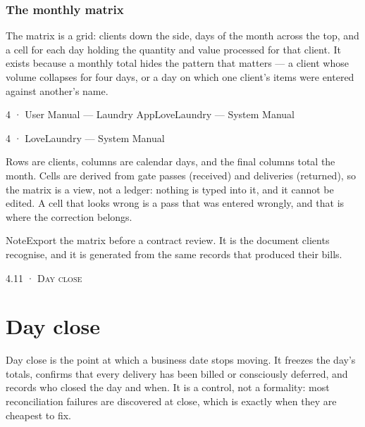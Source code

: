 \documentclass[11pt,a4paper,oneside]{book}
\begin{document}
\subsubsection*{The monthly matrix}
The matrix is a grid: clients down the side, days of the month across the top, and a cell for each day holding the quantity and value processed for that client. It exists because a monthly total hides the pattern that matters — a client whose volume collapses for four days, or a day on which one client's items were entered against another's name.

4 · User Manual — Laundry AppLoveLaundry — System Manual

4 · LoveLaundry — System Manual

Rows are clients, columns are calendar days, and the final columns total the month. Cells are derived from gate passes (received) and deliveries (returned), so the matrix is a view, not a ledger: nothing is typed into it, and it cannot be edited. A cell that looks wrong is a pass that was entered wrongly, and that is where the correction belongs.

\begin{notebox}NoteExport the matrix before a contract review. It is the document clients recognise, and it is generated from the same records that produced their bills.\end{notebox}
\textsc{\small\color{crimson}4.11 · Day close}\par\medskip
\section*{Day close}
Day close is the point at which a business date stops moving. It freezes the day's totals, confirms that every delivery has been billed or consciously deferred, and records who closed the day and when. It is a control, not a formality: most reconciliation failures are discovered at close, which is exactly when they are cheapest to fix.
\end{document}
